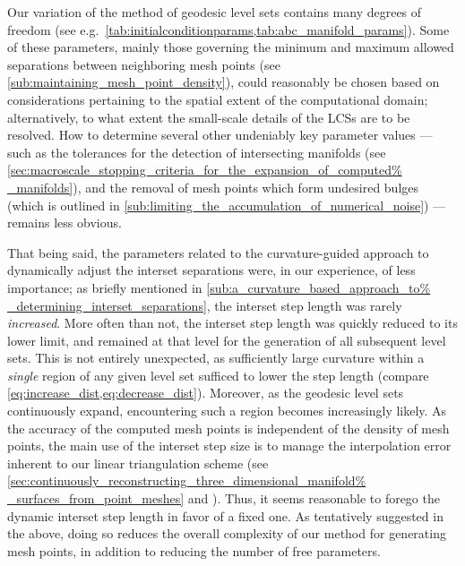 Our variation of the method of geodesic level sets contains many
degrees of freedom (see e.g.\
\cref{tab:initialconditionparams,tab:abc_manifold_params}). Some of these
parameters, mainly those governing the minimum and maximum allowed separations
between neighboring mesh points (see
\cref{sub:maintaining_mesh_point_density}), could reasonably be chosen based on
considerations pertaining to the spatial extent of the computational domain;
alternatively, to what extent the small-scale details of the LCSs are to be
resolved. How to determine several other undeniably key parameter values ---
such as the tolerances  for the detection of intersecting manifolds (see
\cref{sec:macroscale_stopping_criteria_for_the_expansion_of_computed%
_manifolds}), and the removal of mesh points which form undesired bulges (which
is outlined in \cref{sub:limiting_the_accumulation_of_numerical_noise}) ---
remains less obvious.

That being said, the parameters related to the curvature-guided approach to
dynamically adjust the interset separations were, in our experience, of less
importance; as briefly mentioned in \cref{sub:a_curvature_based_approach_to%
_determining_interset_separations}, the interset step length was rarely
\emph{increased}. More often than not, the interset step length was quickly
reduced to its lower limit, and remained at that level for the generation of
all subsequent level sets. This is not entirely unexpected, as sufficiently
large curvature within a \emph{single} region of any given level set sufficed
to lower the step length (compare \cref{eq:increase_dist,eq:decrease_dist}).
Moreover, as the geodesic level sets continuously expand, encountering such a
region becomes increasingly likely. As the accuracy of the computed mesh points
is independent of the density of mesh points, the main use of the interset step
size is to manage the interpolation error inherent to our linear triangulation
scheme (see \cref{sec:continuously_reconstructing_three_dimensional_manifold%
_surfaces_from_point_meshes} and \textcite{krauskopf2003computing}). Thus, it
seems reasonable to forego the dynamic interset step length in favor of a
fixed one. As tentatively suggested in the above, doing so reduces the overall
complexity of our method for generating mesh points, in addition to reducing
the number of free parameters.

